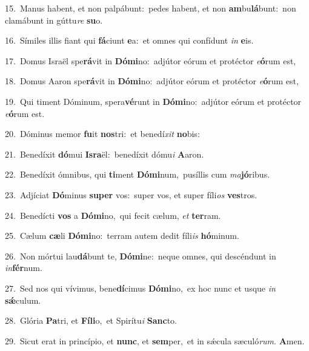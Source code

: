 {\numbfont\textcolor{\numbcolor}{15.}}~Manus habent, et non palpábunt:~\dagger pedes habent, et non \textbf{am}\-bu\-\textbf{lá}\-bunt:~\star non clamábunt in gúttu\textit{re} \textbf{su}\-o.\par
{\numbfont\textcolor{\numbcolor}{16.}}~Símiles illis fiant qui \textbf{fá}\-ciunt \textbf{e}\-a:~\star et omnes qui confídunt \textit{in} \textbf{e}\-is.\par
{\numbfont\textcolor{\numbcolor}{17.}}~Domus Israël spe\-\textbf{rá}\-vit in \textbf{Dó}\-\textbf{mi}no:~\star adjútor eórum et protéctor \textit{e}\-\textbf{ó}rum est,\par
{\numbfont\textcolor{\numbcolor}{18.}}~Domus Aaron spe\-\textbf{rá}\-vit in \textbf{Dó}\-\textbf{mi}no:~\star adjútor eórum et protéctor \textit{e}\-\textbf{ó}rum est,\par
{\numbfont\textcolor{\numbcolor}{19.}}~Qui timent Dóminum, spera\-\textbf{vé}\-runt in \textbf{Dó}\-\textbf{mi}no:~\star adjútor eórum et protéctor \textit{e}\-\textbf{ó}rum est.\par
{\numbfont\textcolor{\numbcolor}{20.}}~Dóminus memor \textbf{fu}\-it \textbf{nos}\-tri:~\star et benedí\textit{xit} \textbf{no}\-bis:\par
{\numbfont\textcolor{\numbcolor}{21.}}~Benedíxit \textbf{dó}\-mui \textbf{Is}\-\textbf{ra}ël:~\star benedíxit dómu\textit{i} \textbf{A}\-aron.\par
{\numbfont\textcolor{\numbcolor}{22.}}~Benedíxit ómnibus, qui \textbf{ti}\-ment \textbf{Dó}\-\textbf{mi}num,~\star pusíllis cum \textit{ma}\-\textbf{jó}ribus.\par
{\numbfont\textcolor{\numbcolor}{23.}}~Adjíciat \textbf{Dó}\-minus \textbf{su}\-\textbf{per} vos:~\star super vos, et super fíli\textit{os} \textbf{ves}\-tros.\par
{\numbfont\textcolor{\numbcolor}{24.}}~Benedícti \textbf{vos} a \textbf{Dó}\-\textbf{mi}no,~\star qui fecit cælum, \textit{et} \textbf{ter}\-ram.\par
{\numbfont\textcolor{\numbcolor}{25.}}~Cælum \textbf{cæ}\-li \textbf{Dó}\-\textbf{mi}no:~\star terram autem dedit fíli\textit{is} \textbf{hó}\-minum.\par
{\numbfont\textcolor{\numbcolor}{26.}}~Non mórtui lau\-\textbf{dá}\-bunt te, \textbf{Dó}\-\textbf{mi}ne:~\star neque omnes, qui descéndunt in \textit{in}\-\textbf{fér}num.\par
{\numbfont\textcolor{\numbcolor}{27.}}~Sed nos qui vívimus, bene\-\textbf{dí}\-cimus \textbf{Dó}\-\textbf{mi}no,~\star ex hoc nunc et usque \textit{in} \textbf{sǽ}\-culum.\par
{\numbfont\textcolor{\numbcolor}{28.}}~Glória \textbf{Pa}\-tri, et \textbf{Fí}\-\textbf{li}o,~\star et Spirítu\textit{i} \textbf{Sanc}\-to.\par
{\numbfont\textcolor{\numbcolor}{29.}}~Sicut erat in princípio, et \textbf{nunc}\-, et \textbf{sem}\-per,~\star et in sǽcula sæculó\-\textit{rum}\-. \textbf{A}\-men.\par
